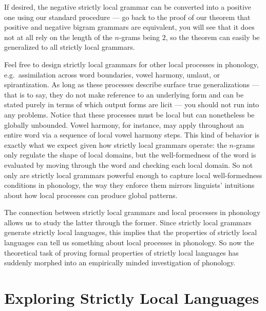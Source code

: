 If desired, the negative strictly local grammar can be converted into a positive one using our standard procedure --- go back to the proof of our theorem that positive and negative bigram grammars are equivalent, you will see that it does not at all rely on the length of the $n$-grams being $2$, so the theorem can easily be generalized to all strictly local grammars.

Feel free to design strictly local grammars for other local processes in phonology, e.g.\ assimilation across word boundaries, vowel harmony, umlaut, or spirantization.
As long as these processes describe surface true generalizations --- that is to say, they do not make reference to an underlying form and can be stated purely in terms of which output forms are licit --- you should not run into any problems.
Notice that these processes must be local but can nonetheless be globally unbounded.
Vowel harmony, for instance, may apply throughout an entire word via a sequence of local vowel harmony steps.
This kind of behavior is exactly what we expect given how strictly local grammars operate: the $n$-grams only regulate the shape of local domains, but the well-formedness of the word is evaluated by moving through the word and checking each local domain.
So not only are strictly local grammars powerful enough to capture local well-formedness conditions in phonology, the way they enforce them mirrors linguists' intuitions about how local processes can produce global patterns.

The connection between strictly local grammars and local processes in phonology allows us to study the latter through the former.
Since strictly local grammars generate strictly local languages, this implies that the properties of strictly local languages can tell us something about local processes in phonology.
So now the theoretical task of proving formal properties of strictly local languages has suddenly morphed into an empirically minded investigation of phonology.

\section{Exploring Strictly Local Languages}

